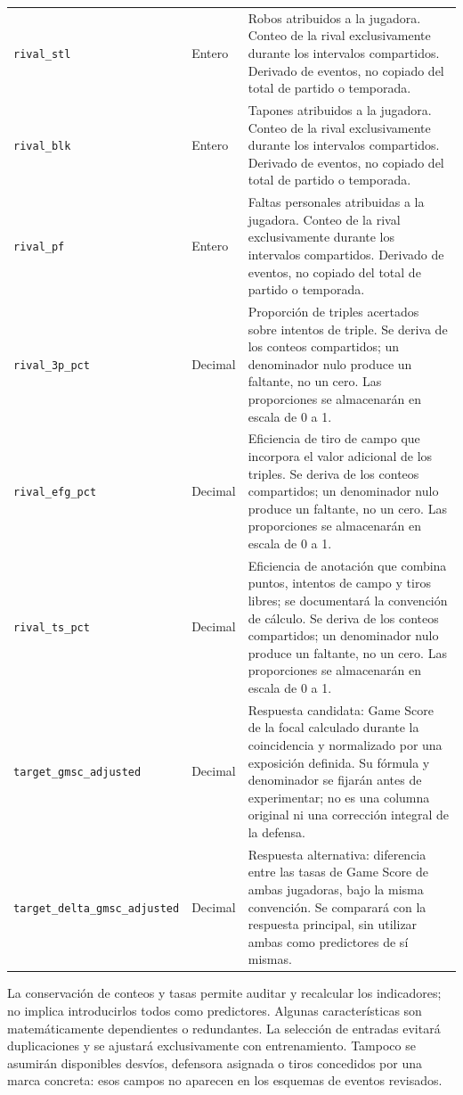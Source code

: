 \begin{longtable}{@{}>{\raggedright\arraybackslash}p{5.0cm}>{\raggedright\arraybackslash}p{1.9cm}>{\raggedright\arraybackslash}p{7.7cm}@{}}
\texttt{rival\_\allowbreak stl} & Entero & Robos atribuidos a la jugadora. Conteo de la rival exclusivamente durante los intervalos compartidos. Derivado de eventos, no copiado del total de partido o temporada.\\
\texttt{rival\_\allowbreak blk} & Entero & Tapones atribuidos a la jugadora. Conteo de la rival exclusivamente durante los intervalos compartidos. Derivado de eventos, no copiado del total de partido o temporada.\\
\texttt{rival\_\allowbreak pf} & Entero & Faltas personales atribuidas a la jugadora. Conteo de la rival exclusivamente durante los intervalos compartidos. Derivado de eventos, no copiado del total de partido o temporada.\\
\texttt{rival\_\allowbreak 3p\_\allowbreak pct} & Decimal & Proporción de triples acertados sobre intentos de triple. Se deriva de los conteos compartidos; un denominador nulo produce un faltante, no un cero. Las proporciones se almacenarán en escala de 0 a 1.\\
\texttt{rival\_\allowbreak efg\_\allowbreak pct} & Decimal & Eficiencia de tiro de campo que incorpora el valor adicional de los triples. Se deriva de los conteos compartidos; un denominador nulo produce un faltante, no un cero. Las proporciones se almacenarán en escala de 0 a 1.\\
\texttt{rival\_\allowbreak ts\_\allowbreak pct} & Decimal & Eficiencia de anotación que combina puntos, intentos de campo y tiros libres; se documentará la convención de cálculo. Se deriva de los conteos compartidos; un denominador nulo produce un faltante, no un cero. Las proporciones se almacenarán en escala de 0 a 1.\\
\texttt{target\_\allowbreak gmsc\_\allowbreak adjusted} & Decimal & Respuesta candidata: Game Score de la focal calculado durante la coincidencia y normalizado por una exposición definida. Su fórmula y denominador se fijarán antes de experimentar; no es una columna original ni una corrección integral de la defensa.\\
\texttt{target\_\allowbreak delta\_\allowbreak gmsc\_\allowbreak adjusted} & Decimal & Respuesta alternativa: diferencia entre las tasas de Game Score de ambas jugadoras, bajo la misma convención. Se comparará con la respuesta principal, sin utilizar ambas como predictores de sí mismas.\\
\end{longtable}
\endgroup
La conservación de conteos y tasas permite auditar y recalcular los indicadores; no implica introducirlos todos como predictores. Algunas características son matemáticamente dependientes o redundantes. La selección de entradas evitará duplicaciones y se ajustará exclusivamente con entrenamiento. Tampoco se asumirán disponibles desvíos, defensora asignada o tiros concedidos por una marca concreta: esos campos no aparecen en los esquemas de eventos revisados.

